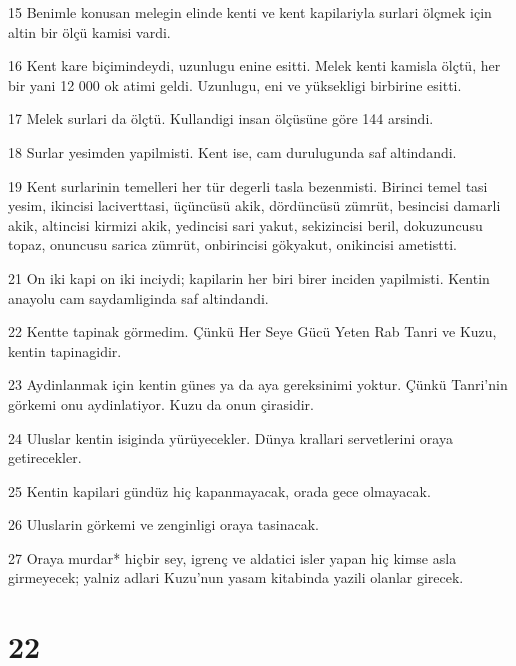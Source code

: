 \par 15 Benimle konusan melegin elinde kenti ve kent kapilariyla surlari ölçmek için altin bir ölçü kamisi vardi.
\par 16 Kent kare biçimindeydi, uzunlugu enine esitti. Melek kenti kamisla ölçtü, her bir yani 12 000 ok atimi geldi. Uzunlugu, eni ve yüksekligi birbirine esitti.
\par 17 Melek surlari da ölçtü. Kullandigi insan ölçüsüne göre 144 arsindi.
\par 18 Surlar yesimden yapilmisti. Kent ise, cam durulugunda saf altindandi.
\par 19 Kent surlarinin temelleri her tür degerli tasla bezenmisti. Birinci temel tasi yesim, ikincisi laciverttasi, üçüncüsü akik, dördüncüsü zümrüt, besincisi damarli akik, altincisi kirmizi akik, yedincisi sari yakut, sekizincisi beril, dokuzuncusu topaz, onuncusu sarica zümrüt, onbirincisi gökyakut, onikincisi ametistti.
\par 21 On iki kapi on iki inciydi; kapilarin her biri birer inciden yapilmisti. Kentin anayolu cam saydamliginda saf altindandi.
\par 22 Kentte tapinak görmedim. Çünkü Her Seye Gücü Yeten Rab Tanri ve Kuzu, kentin tapinagidir.
\par 23 Aydinlanmak için kentin günes ya da aya gereksinimi yoktur. Çünkü Tanri'nin görkemi onu aydinlatiyor. Kuzu da onun çirasidir.
\par 24 Uluslar kentin isiginda yürüyecekler. Dünya krallari servetlerini oraya getirecekler.
\par 25 Kentin kapilari gündüz hiç kapanmayacak, orada gece olmayacak.
\par 26 Uluslarin görkemi ve zenginligi oraya tasinacak.
\par 27 Oraya murdar* hiçbir sey, igrenç ve aldatici isler yapan hiç kimse asla girmeyecek; yalniz adlari Kuzu'nun yasam kitabinda yazili olanlar girecek.

\chapter{22}

